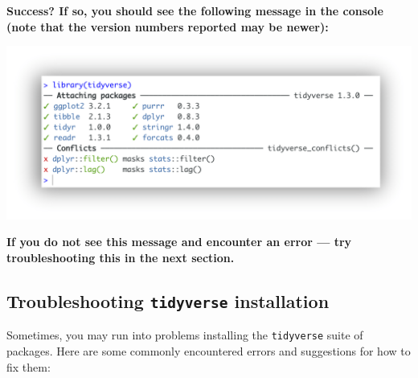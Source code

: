 \documentclass[
]{book}
\begin{document}
\begin{enumerate}
\begin{alert}
  \textbf{Success? If so, you should see the following message in the console (note that the version numbers reported may be newer):}

  \end{alert}

  \includegraphics{R/Rinstall/images/tidyverse_install.png}

  \begin{alert}

  \textbf{If you do not see this message and encounter an error --- try troubleshooting this in the next section.}

  \end{alert}
\end{enumerate}

\hypertarget{troubleshooting-tidyverse-installation}{%
\subsection{\texorpdfstring{Troubleshooting \texttt{tidyverse} installation}{Troubleshooting tidyverse installation}}\label{troubleshooting-tidyverse-installation}}

Sometimes, you may run into problems installing the \texttt{tidyverse} suite of packages. Here are some commonly encountered errors and suggestions for how to fix them:
\end{document}
